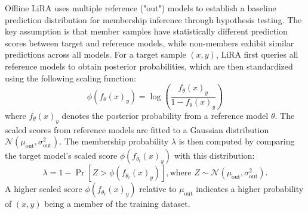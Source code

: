Offline LiRA uses multiple reference ("out") models to establish a baseline prediction distribution for membership inference through hypothesis testing. 
The key assumption is that member samples have statistically different prediction scores between target and reference models, while non-members exhibit similar predictions across all models.
For a target sample $(x,y)$, LiRA first queries all reference models to obtain posterior probabilities, which are then standardized using the following scaling function:
\begin{equation}
    \phi(f_\theta(x)_{y}) = \log\left(\frac{f_\theta(x)_{y}}{1 - f_\theta(x)_{y}}\right)
    \label{eq:lira_rescale}
\end{equation}
where $f_{\theta}(x)_y$ denotes the posterior probability from a reference model $\theta$.
The scaled scores from reference models are fitted to a Gaussian distribution $\mathcal{N}(\mu_{\text{out}}, \sigma_{\text{out}}^2)$. The membership probability $\lambda$ is then computed by comparing the target model's scaled score $\phi(f_{\theta_t}(x)_y)$ with this distribution:
\begin{equation}
    \lambda = 1 - \Pr[Z > \phi(f_{\theta_t}(x)_y)], \text{where } Z \sim \mathcal{N}(\mu_{\text{out}}, \sigma_{\text{out}}^2).
    \label{eq:lira_result}
\end{equation}
A higher scaled score $\phi(f_{\theta_t}(x)_y)$ relative to $\mu_{\text{out}}$ indicates a higher probability of $(x,y)$ being a member of the training dataset.

